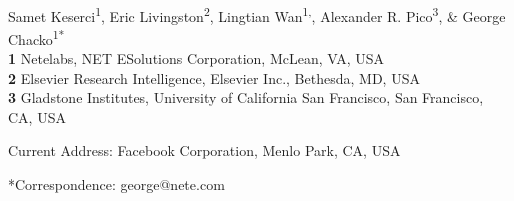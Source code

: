 \documentclass[10pt,letterpaper]{article}
\date{}
\begin{document}
\vspace*{0.2in}

\begin{flushleft}
{\Large
\textbf{} %
}
\newline
\\
Samet Keserci\textsuperscript{1},
Eric Livingston\textsuperscript{2},
Lingtian Wan\textsuperscript{1,\textcurrency},
Alexander R. Pico\textsuperscript{3},
 \& George Chacko\textsuperscript{1*}
\\
\bigskip
\textbf{1} Netelabs, NET ESolutions Corporation, McLean, VA, USA
\\
\textbf{2} Elsevier Research Intelligence, Elsevier Inc., Bethesda, MD, USA
\\
\textbf{3} Gladstone Institutes, University of California San Francisco, San Francisco, CA, USA
\\
\bigskip


% 
%


\textcurrency Current Address: Facebook Corporation, Menlo Park, CA, USA %



*Correspondence: george@nete.com
\end{flushleft}
\end{document}
